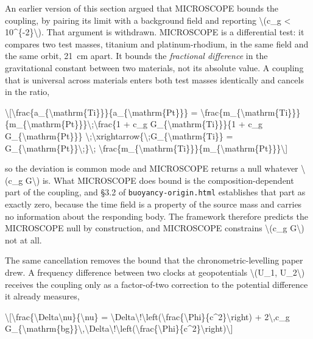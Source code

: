\documentclass[
  10pt,
]{article}
\begin{document}
An earlier version of this section argued that MICROSCOPE bounds the
coupling, by pairing its limit with a background field and reporting
\textbackslash(c\_g \textless{} 10\^{}\{-2\}\textbackslash). That
argument is withdrawn. MICROSCOPE is a differential test: it compares
two test masses, titanium and platinum-rhodium, in the same field and
the same orbit, 21~cm apart. It bounds the \emph{fractional difference}
in the gravitational constant between two materials, not its absolute
value. A coupling that is universal across materials enters both test
masses identically and cancels in the ratio,

\textbackslash{[}\textbackslash frac\{a\_\{\textbackslash mathrm\{Ti\}\}\}\{a\_\{\textbackslash mathrm\{Pt\}\}\}
=
\textbackslash frac\{m\_\{\textbackslash mathrm\{Ti\}\}\}\{m\_\{\textbackslash mathrm\{Pt\}\}\}\textbackslash;\textbackslash frac\{1
+ c\_g G\_\{\textbackslash mathrm\{Ti\}\}\}\{1 + c\_g
G\_\{\textbackslash mathrm\{Pt\}\}\}
\textbackslash;\textbackslash xrightarrow\{\textbackslash;G\_\{\textbackslash mathrm\{Ti\}\}
= G\_\{\textbackslash mathrm\{Pt\}\}\textbackslash;\}\textbackslash;
\textbackslash frac\{m\_\{\textbackslash mathrm\{Ti\}\}\}\{m\_\{\textbackslash mathrm\{Pt\}\}\}\textbackslash{]}

so the deviation is common mode and MICROSCOPE returns a null whatever
\textbackslash(c\_g G\textbackslash) is. What MICROSCOPE does bound is
the composition-dependent part of the coupling, and §3.2 of
\texttt{buoyancy-origin.html} establishes that part as exactly zero,
because the time field is a property of the source mass and carries no
information about the responding body. The framework therefore predicts
the MICROSCOPE null by construction, and MICROSCOPE constrains
\textbackslash(c\_g G\textbackslash) not at all.

The same cancellation removes the bound that the chronometric-levelling
paper drew. A frequency difference between two clocks at geopotentials
\textbackslash(U\_1, U\_2\textbackslash) receives the coupling only as a
factor-of-two correction to the potential difference it already
measures,

\textbackslash{[}\textbackslash frac\{\textbackslash Delta\textbackslash nu\}\{\textbackslash nu\}
=
\textbackslash Delta\textbackslash!\textbackslash left(\textbackslash frac\{\textbackslash Phi\}\{c\^{}2\}\textbackslash right)
+ 2\textbackslash,c\_g
G\_\{\textbackslash mathrm\{bg\}\}\textbackslash,\textbackslash Delta\textbackslash!\textbackslash left(\textbackslash frac\{\textbackslash Phi\}\{c\^{}2\}\textbackslash right)\textbackslash{]}
\end{document}
